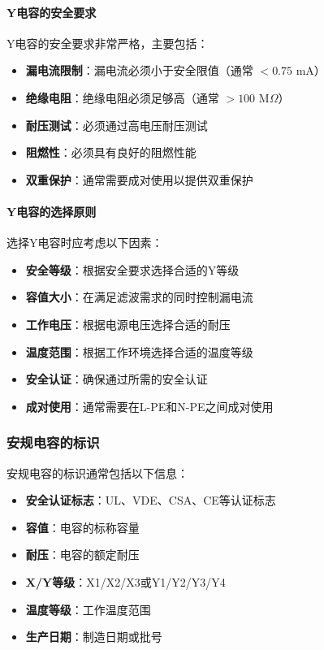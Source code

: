 \documentclass[12pt,UTF8]{ctexbook}
\begin{document}
\paragraph{Y电容的安全要求}

Y电容的安全要求非常严格，主要包括：

\begin{itemize}[leftmargin=2cm]
    \item \textbf{漏电流限制}：漏电流必须小于安全限值（通常 $< 0.75$ mA）
    \item \textbf{绝缘电阻}：绝缘电阻必须足够高（通常 $> 100$ M$\Omega$）
    \item \textbf{耐压测试}：必须通过高电压耐压测试
    \item \textbf{阻燃性}：必须具有良好的阻燃性能
    \item \textbf{双重保护}：通常需要成对使用以提供双重保护
\end{itemize}

\paragraph{Y电容的选择原则}

选择Y电容时应考虑以下因素：

\begin{itemize}[leftmargin=2cm]
    \item \textbf{安全等级}：根据安全要求选择合适的Y等级
    \item \textbf{容值大小}：在满足滤波需求的同时控制漏电流
    \item \textbf{工作电压}：根据电源电压选择合适的耐压
    \item \textbf{温度范围}：根据工作环境选择合适的温度等级
    \item \textbf{安全认证}：确保通过所需的安全认证
    \item \textbf{成对使用}：通常需要在L-PE和N-PE之间成对使用
\end{itemize}

\subsubsection{安规电容的标识}

安规电容的标识通常包括以下信息：

\begin{itemize}[leftmargin=2cm]
    \item \textbf{安全认证标志}：UL、VDE、CSA、CE等认证标志
    \item \textbf{容值}：电容的标称容量
    \item \textbf{耐压}：电容的额定耐压
    \item \textbf{X/Y等级}：X1/X2/X3或Y1/Y2/Y3/Y4
    \item \textbf{温度等级}：工作温度范围
    \item \textbf{生产日期}：制造日期或批号
\end{itemize}
\end{document}
